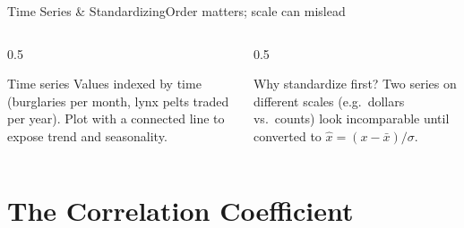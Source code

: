 \documentclass[aspectratio=169,11pt]{beamer}
\begin{document}
\begin{frame}{Time Series \& Standardizing}{Order matters; scale can mislead}
  \begin{columns}[T]
    \begin{column}{0.5\textwidth}
      \begin{block}{Time series}
        \small Values indexed by time (burglaries per month, lynx pelts
        traded per year). Plot with a connected line to expose trend and
        seasonality.
      \end{block}
    \end{column}
    \begin{column}{0.5\textwidth}
      \begin{exampleblock}{Why standardize first?}
        \small Two series on different scales (e.g.\ dollars vs.\ counts)
        look incomparable until converted to 
        $\hat x = (x-\bar x)/\sigma$.
      \end{exampleblock}
    \end{column}
  \end{columns}
  \vfill
  \begin{center}
  \end{center}
\end{frame}

\section{The Correlation Coefficient}
\end{document}
